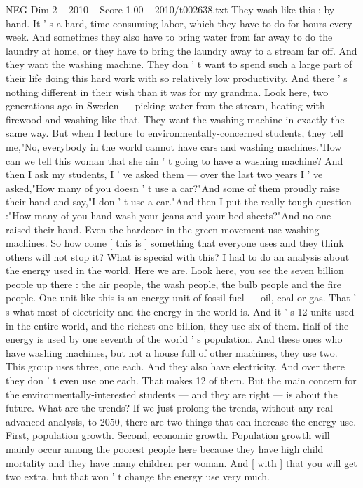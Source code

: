 \begin{textsample}{NEG Dim 2 – 2010 – Score 1.00 – 2010/t002638.txt}
They wash like this : by hand.
It ' s a hard, time-consuming labor, which they have to do for hours every week.
And sometimes they also have to bring water from far away to do the laundry at home, or they have to bring the laundry away to a stream far off.
And they want the washing machine.
They don ' t want to spend such a large part of their life doing this hard work with so relatively low productivity.
And there ' s nothing different in their wish than it was for my grandma.
Look here, two generations ago in Sweden — picking water from the stream, heating with firewood and washing like that.
They want the washing machine in exactly the same way.
But when I lecture to environmentally-concerned students, they tell me,"No, everybody in the world cannot have cars and washing machines."How can we tell this woman that she ain ' t going to have a washing machine?
And then I ask my students, I ' ve asked them — over the last two years I ' ve asked,"How many of you doesn ' t use a car?"And some of them proudly raise their hand and say,"I don ' t use a car."And then I put the really tough question :"How many of you hand-wash your jeans and your bed sheets?"And no one raised their hand.
Even the hardcore in the green movement use washing machines.
So how come [ this is ] something that everyone uses and they think others will not stop it?
What is special with this?
I had to do an analysis about the energy used in the world.
Here we are.
Look here, you see the seven billion people up there : the air people, the wash people, the bulb people and the fire people.
One unit like this is an energy unit of fossil fuel — oil, coal or gas.
That ' s what most of electricity and the energy in the world is.
And it ' s 12 units used in the entire world, and the richest one billion, they use six of them.
Half of the energy is used by one seventh of the world ' s population.
And these ones who have washing machines, but not a house full of other machines, they use two.
This group uses three, one each.
And they also have electricity.
And over there they don ' t even use one each.
That makes 12 of them.
But the main concern for the environmentally-interested students — and they are right — is about the future.
What are the trends?
If we just prolong the trends, without any real advanced analysis, to 2050, there are two things that can increase the energy use.
First, population growth.
Second, economic growth.
Population growth will mainly occur among the poorest people here because they have high child mortality and they have many children per woman.
And [ with ] that you will get two extra, but that won ' t change the energy use very much.

\end{textsample}
